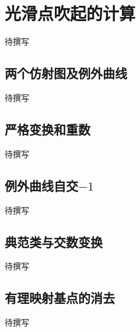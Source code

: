 
% 
% 

\section{光滑点吹起的计算}
\label{g5:sec:2601}

待撰写

\subsection{两个仿射图及例外曲线}
\label{g5:subsec:2601:01}
待撰写

\subsection{严格变换和重数}
\label{g5:subsec:2601:02}
待撰写

\subsection{\texorpdfstring{例外曲线自交\(-1\)}{例外曲线自交−1}}
\label{g5:subsec:2601:03}
待撰写

\subsection{典范类与交数变换}
\label{g5:subsec:2601:04}
待撰写

\subsection{有理映射基点的消去}
\label{g5:subsec:2601:05}
待撰写
